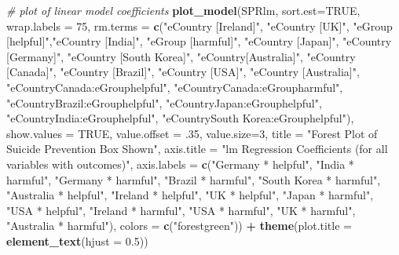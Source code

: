 \documentclass[]{article}
\newenvironment{Shaded}{\begin{snugshade}}{\end{snugshade}}
\newcommand{\CommentTok}[1]{\textcolor[rgb]{0.56,0.35,0.01}{\textit{#1}}}
\newcommand{\DataTypeTok}[1]{\textcolor[rgb]{0.13,0.29,0.53}{#1}}
\newcommand{\DecValTok}[1]{\textcolor[rgb]{0.00,0.00,0.81}{#1}}
\newcommand{\FloatTok}[1]{\textcolor[rgb]{0.00,0.00,0.81}{#1}}
\newcommand{\KeywordTok}[1]{\textcolor[rgb]{0.13,0.29,0.53}{\textbf{#1}}}
\newcommand{\NormalTok}[1]{#1}
\newcommand{\OperatorTok}[1]{\textcolor[rgb]{0.81,0.36,0.00}{\textbf{#1}}}
\newcommand{\OtherTok}[1]{\textcolor[rgb]{0.56,0.35,0.01}{#1}}
\newcommand{\StringTok}[1]{\textcolor[rgb]{0.31,0.60,0.02}{#1}}
\begin{document}
\begin{Shaded}
\begin{Highlighting}[]
\CommentTok{# plot of linear model coefficients}
\KeywordTok{plot_model}\NormalTok{(SPRlm, }\DataTypeTok{sort.est=}\OtherTok{TRUE}\NormalTok{, }\DataTypeTok{wrap.labels =} \DecValTok{75}\NormalTok{, }\DataTypeTok{rm.terms =} \KeywordTok{c}\NormalTok{(}\StringTok{"eCountry [Ireland]"}\NormalTok{, }\StringTok{"eCountry [UK]"}\NormalTok{, }\StringTok{"eGroup [helpful]"}\NormalTok{,}\StringTok{"eCountry [India]"}\NormalTok{, }\StringTok{"eGroup [harmful]"}\NormalTok{, }\StringTok{"eCountry [Japan]"}\NormalTok{, }\StringTok{"eCountry [Germany]"}\NormalTok{, }\StringTok{"eCountry [South Korea]"}\NormalTok{, }\StringTok{"eCountry[Australia]"}\NormalTok{, }\StringTok{"eCountry [Canada]"}\NormalTok{, }\StringTok{"eCountry [Brazil]"}\NormalTok{, }\StringTok{"eCountry [USA]"}\NormalTok{, }\StringTok{"eCountry [Australia]"}\NormalTok{, }\StringTok{"eCountryCanada:eGrouphelpful"}\NormalTok{, }\StringTok{"eCountryCanada:eGroupharmful"}\NormalTok{, }\StringTok{"eCountryBrazil:eGrouphelpful"}\NormalTok{, }\StringTok{"eCountryJapan:eGrouphelpful"}\NormalTok{, }\StringTok{"eCountryIndia:eGrouphelpful"}\NormalTok{, }\StringTok{"eCountrySouth Korea:eGrouphelpful"}\NormalTok{), }\DataTypeTok{show.values =} \OtherTok{TRUE}\NormalTok{, }\DataTypeTok{value.offset =} \FloatTok{.35}\NormalTok{, }\DataTypeTok{value.size=}\DecValTok{3}\NormalTok{, }\DataTypeTok{title =} \StringTok{"Forest Plot of Suicide Prevention Box Shown"}\NormalTok{, }\DataTypeTok{axis.title =} \StringTok{"lm Regression Coefficients (for all variables with outcomes)"}\NormalTok{, }\DataTypeTok{axis.labels =} \KeywordTok{c}\NormalTok{(}\StringTok{"Germany * helpful"}\NormalTok{, }\StringTok{"India * harmful"}\NormalTok{, }\StringTok{"Germany * harmful"}\NormalTok{, }\StringTok{"Brazil * harmful"}\NormalTok{, }\StringTok{"South Korea * harmful"}\NormalTok{, }\StringTok{"Australia * helpful"}\NormalTok{, }\StringTok{"Ireland * helpful"}\NormalTok{, }\StringTok{"UK * helpful"}\NormalTok{, }\StringTok{"Japan * harmful"}\NormalTok{, }\StringTok{"USA * helpful"}\NormalTok{, }\StringTok{"Ireland * harmful"}\NormalTok{, }\StringTok{"USA * harmful"}\NormalTok{, }\StringTok{"UK * harmful"}\NormalTok{, }\StringTok{"Australia * harmful"}\NormalTok{), }\DataTypeTok{colors =} \KeywordTok{c}\NormalTok{(}\StringTok{"forestgreen"}\NormalTok{)) }\OperatorTok{+}\StringTok{ }
\StringTok{       }\KeywordTok{theme}\NormalTok{(}\DataTypeTok{plot.title =} \KeywordTok{element_text}\NormalTok{(}\DataTypeTok{hjust =} \FloatTok{0.5}\NormalTok{))}
\end{Highlighting}
\end{Shaded}
\end{document}
